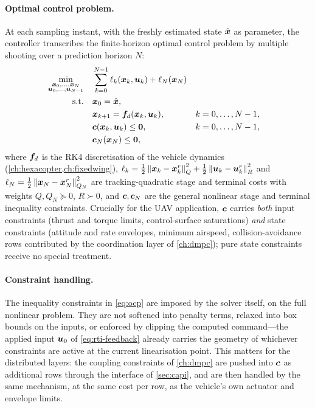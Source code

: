 \paragraph{Optimal control problem.} At each sampling instant, with the freshly
estimated state $\hat{\bm{x}}$ as parameter, the controller transcribes the
finite-horizon optimal control problem by multiple shooting over a prediction
horizon $N$:
\begin{subequations}
\label{eq:ocp}
\begin{align}
\min_{\substack{\bm{x}_0,\dots,\bm{x}_N\\ \bm{u}_0,\dots,\bm{u}_{N-1}}}\quad
& \sum_{k=0}^{N-1}\ell_k(\bm{x}_k,\bm{u}_k)+\ell_N(\bm{x}_N)\\
\text{s.t.}\quad
& \bm{x}_0=\hat{\bm{x}},\\
& \bm{x}_{k+1}=\bm{f}_d(\bm{x}_k,\bm{u}_k), && k=0,\dots,N-1,\\
& \bm{c}(\bm{x}_k,\bm{u}_k)\le\bm{0}, && k=0,\dots,N-1,\\
& \bm{c}_N(\bm{x}_N)\le\bm{0},
\end{align}
\end{subequations}
where $\bm{f}_d$ is the RK4 discretisation of the vehicle dynamics
(\cref{ch:hexacopter,ch:fixedwing}), $\ell_k=\tfrac12\left\lVert \bm{x}_k-\bm{x}_k^{r} \right\rVert_Q^2
+\tfrac12\left\lVert \bm{u}_k-\bm{u}_k^{r} \right\rVert_R^2$ and $\ell_N=\tfrac12\left\lVert \bm{x}_N-\bm{x}_N^{r} \right\rVert_{Q_N}^2$
are tracking-quadratic stage and terminal costs with weights $Q,Q_N\succeq0$,
$R\succ0$, and $\bm{c},\bm{c}_N$ are the general nonlinear stage and terminal
inequality constraints. Crucially for the UAV application, $\bm{c}$ carries
\emph{both} input constraints (thrust and torque limits, control-surface
saturations) \emph{and} state constraints (attitude and rate envelopes,
minimum airspeed, collision-avoidance rows contributed by the coordination layer
of \cref{ch:dmpc}); pure state constraints receive no special treatment.

\paragraph{Constraint handling.} The inequality constraints in \cref{eq:ocp} are
imposed by the solver itself, on the full nonlinear problem. They are not
softened into penalty terms, relaxed into box bounds on the inputs, or enforced
by clipping the computed command---the applied input $\bm{u}_0$ of
\cref{eq:rti-feedback} already carries the geometry of whichever constraints are
active at the current linearisation point. This matters for the distributed
layers: the coupling constraints of \cref{ch:dmpc} are pushed into $\bm{c}$ as
additional rows through the interface of \cref{sec:capi}, and are then handled
by the same mechanism, at the same cost per row, as the vehicle's own actuator
and envelope limits.

